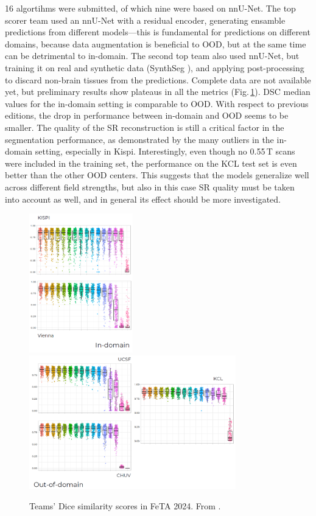 16 algortihms were submitted, of which nine were based on nnU-Net. The top scorer team used an nnU-Net with a residual encoder, generating ensamble predictions from different models---this is fundamental for predictions on different domains, because data augmentation is beneficial to OOD, but at the same time can be detrimental to in-domain. The second top team also used nnU-Net, but training it on real and synthetic data (SynthSeg \cite{Billot2023}), and applying post-processing to discard non-brain tissues from the predictions. Complete data are not available yet, but preliminary results show plateaus in all the metrics (Fig.\,\ref{fig:FeTA2024_results}). DSC median values for the in-domain setting is comparable to OOD. With respect to previous editions, the drop in performance between in-domain and OOD seems to be smaller. The quality of the SR reconstruction is still a critical factor in the segmentation performance, as demonstrated by the many outliers in the in-domain setting, especially in Kispi. Interestingly, even though no 0.55\,T scans were included in the training set, the performance on the KCL test set is even better than the other OOD centers. This suggests that the models generalize well across different field strengths, but also in this case SR quality must be taken into account as well, and in general its effect should be more investigated.

\begin{figure}[htbp]
    \centering
    \includegraphics[width=0.4\textwidth]{figures/feta24_in-domain.png}
    \includegraphics[width=0.8\textwidth]{figures/feta24_out-of-domain.png}
    \caption{Teams' Dice similarity scores in FeTA 2024. From \cite{FeTA2024}.}
    \label{fig:FeTA2024_results}
\end{figure}

